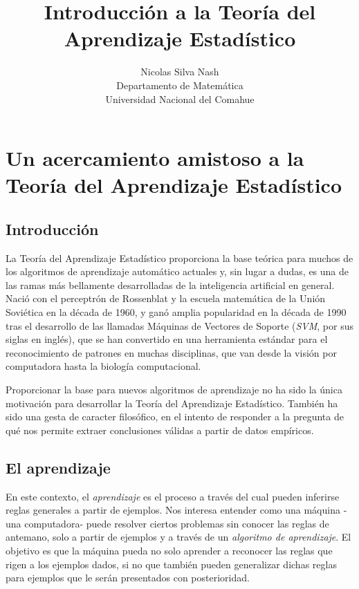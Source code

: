 \documentclass{report}
\begin{document}
\title{Introducción a la Teoría del Aprendizaje Estadístico}
\author{Nicolas Silva Nash \\ Departamento de Matemática \\ Universidad Nacional del Comahue}
\maketitle
\tableofcontents
\chapter{Un acercamiento amistoso a la Teoría del Aprendizaje Estadístico}
\section{Introducción}
La Teoría del Aprendizaje Estadístico proporciona la base teórica para muchos de los algoritmos de aprendizaje automático actuales y,
sin lugar a dudas, es una de las ramas más bellamente desarrolladas de la inteligencia artificial en general. Nació con el perceptrón de Rossenblat
y la escuela matemática de la Unión Soviética en la década de 1960, y ganó amplia popularidad en la década de 1990 tras el desarrollo de las llamadas 
Máquinas de Vectores de Soporte (\textit{SVM}, por sus siglas en inglés), que se han convertido en una herramienta estándar para el reconocimiento de 
patrones en muchas disciplinas, que van desde la visión por computadora hasta la biología computacional.

Proporcionar la base para nuevos algoritmos de aprendizaje no ha sido la única motivación para desarrollar la Teoría del Aprendizaje 
Estadístico. También ha sido una gesta de caracter filosófico, en el intento de responder a la pregunta de qué nos permite extraer conclusiones válidas 
a partir de datos empíricos.  

\section{El aprendizaje}

En este contexto, el \textit{aprendizaje} es el proceso a través del cual pueden inferirse reglas generales a partir de ejemplos. Nos interesa 
entender como una máquina -una computadora- puede resolver ciertos problemas sin conocer las reglas de antemano, solo a partir de ejemplos y a través
de un \textit{algoritmo de aprendizaje}. El objetivo es que la máquina pueda no solo aprender a reconocer las reglas que rigen a los ejemplos dados,
si no que también pueden generalizar dichas reglas para ejemplos que le serán presentados con posterioridad.
\end{document}
